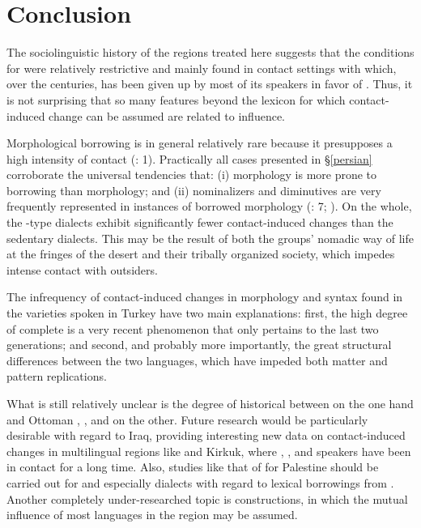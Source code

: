 \documentclass[output=paper]{langsci/langscibook}
\begin{document}
\section{Conclusion} 

The sociolinguistic history of the regions treated here suggests that the conditions for  were relatively restrictive and mainly found in contact settings with  which, over the centuries, has been given up by most of its speakers in favor of . Thus, it is not surprising that so many features beyond the lexicon for which contact-induced change can be assumed are related to  influence. 

Morphological borrowing is in general relatively rare because it presupposes a high intensity of contact (\citealt{GardaniArkadievAmiridze2015}: 1). Practically all cases presented in §\ref{persian} corroborate the universal tendencies that: (i)  morphology is more prone to borrowing than  morphology; and (ii) nominalizers and diminutives are very frequently represented in instances of borrowed  morphology (\citealt{GardaniArkadievAmiridze2015}: 7; \citealt{Seifart2013}). On the whole, the -type dialects exhibit significantly fewer contact-induced changes than the sedentary dialects. This may be the result of both the  groups' nomadic way of life at the fringes of the desert and their tribally organized society, which impedes intense contact with outsiders.

The  infrequency of contact-induced changes in morphology and syntax found in the  varieties spoken in Turkey have two main explanations: first, the high degree of complete  is a very recent phenomenon that only pertains to the last two generations; and second, and probably more importantly, the great structural differences between the two languages, which have impeded both matter and pattern replications.

What is still relatively unclear is the degree of historical  between  on the one hand and Ottoman , , and  on the other. Future research would be particularly desirable with regard to Iraq, providing interesting new data on contact-induced changes in multilingual regions like  and Kirkuk, where , , and  speakers have been in contact for a long time. Also, studies like that of  \citet{Neishtadt2015} for Palestine should be carried out for  and especially  dialects with regard to lexical borrowings from . Another completely under-researched topic is  constructions, in which the mutual influence of most languages in the region may be assumed.
\end{document}
